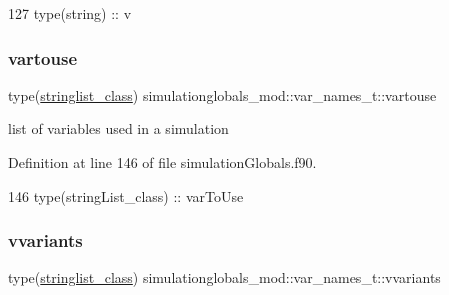 \begin{DoxyCode}
127         \textcolor{keywordtype}{type}(string) :: v
\end{DoxyCode}
\mbox{\label{structsimulationglobals__mod_1_1var__names__t_a53aa98ee01e1fa414c511cdc8066873c}} 
\subsubsection{\texorpdfstring{vartouse}{vartouse}}
{\footnotesize\ttfamily type(\mbox{\hyperlink{structsimulationglobals__mod_1_1stringlist__class}{stringlist\+\_\+class}}) simulationglobals\+\_\+mod\+::var\+\_\+names\+\_\+t\+::vartouse\hspace{0.3cm}{\ttfamily [private]}}



list of variables used in a simulation 



Definition at line 146 of file simulation\+Globals.\+f90.


\begin{DoxyCode}
146         \textcolor{keywordtype}{type}(stringList\_class) :: varToUse
\end{DoxyCode}
\mbox{\label{structsimulationglobals__mod_1_1var__names__t_af5fb2ba506cc220275c330dca9674b0e}} 
\subsubsection{\texorpdfstring{vvariants}{vvariants}}
{\footnotesize\ttfamily type(\mbox{\hyperlink{structsimulationglobals__mod_1_1stringlist__class}{stringlist\+\_\+class}}) simulationglobals\+\_\+mod\+::var\+\_\+names\+\_\+t\+::vvariants\hspace{0.3cm}{\ttfamily [private]}}



